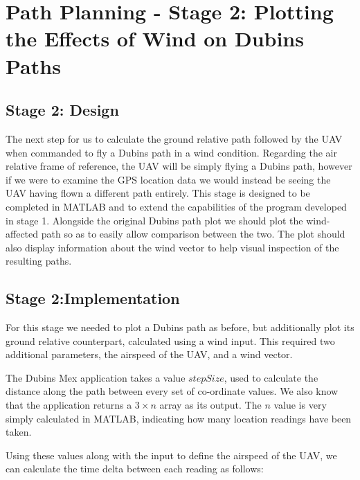 \section{Path Planning - Stage 2: Plotting the Effects of Wind on Dubins Paths}
\label{task1:stage1}

\subsection{Stage 2: Design}
\label{task1:stage2:design}

The next step for us to calculate the ground relative path followed by the UAV when commanded to fly a Dubins path in a wind condition. Regarding the air relative frame of reference, the UAV will be simply flying a Dubins path, however if we were to examine the GPS location data we would instead be seeing the UAV having flown a different path entirely. This stage is designed to be completed in MATLAB and to extend the capabilities of the program developed in stage 1. Alongside the original Dubins path plot we should plot the wind-affected path so as to easily allow comparison between the two. The plot should also display information about the wind vector to help visual inspection of the resulting paths. 

\subsection{Stage 2:Implementation}
\label{task1:stage2:implementation}

For this stage we needed to plot a Dubins path as before, but additionally plot its ground relative counterpart, calculated using a wind input. This required two additional parameters, the airspeed of the UAV, and a wind vector. 

The Dubins Mex application takes a value $stepSize$, used to calculate the distance along the path between every set of co-ordinate values. We also know that the application returns a $3 \times n$ array as its output. The $n$ value is very simply calculated in MATLAB, indicating how many location readings have been taken.

Using these values along with the input to define the airspeed of the UAV, we can calculate the time delta between each reading as follows:

